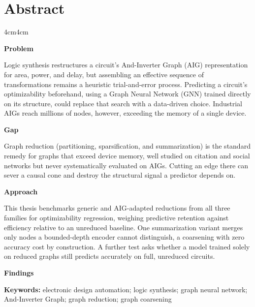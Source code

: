 \chapter*{Abstract}
\label{sec:abstract}
\begin{adjustwidth}{4cm}{4cm}

\par\medskip\noindent\textbf{Problem}\par\nobreak%
Logic synthesis restructures a circuit's And-Inverter Graph (AIG) representation for area, power, and delay, but assembling an effective sequence of transformations remains a heuristic trial-and-error process. Predicting a circuit's optimizability beforehand, using a Graph Neural Network (GNN) trained directly on its structure, could replace that search with a data-driven choice. Industrial AIGs reach millions of nodes, however, exceeding the memory of a single device.

\par\medskip\noindent\textbf{Gap}\par\nobreak%
Graph reduction (partitioning, sparsification, and summarization) is the standard remedy for graphs that exceed device memory, well studied on citation and social networks but never systematically evaluated on AIGs. Cutting an edge there can sever a causal cone and destroy the structural signal a predictor depends on.

\par\medskip\noindent\textbf{Approach}\par\nobreak%
This thesis benchmarks generic and AIG-adapted reductions from all three families for optimizability regression, weighing predictive retention against efficiency relative to an unreduced baseline. One summarization variant merges only nodes a bounded-depth encoder cannot distinguish, a coarsening with zero accuracy cost by construction. A further test asks whether a model trained solely on reduced graphs still predicts accurately on full, unreduced circuits.

\par\medskip\noindent\textbf{Findings}\par\nobreak%

\end{adjustwidth}

\vspace{1em}
\noindent\textbf{Keywords:}
electronic design automation; logic synthesis; graph neural network; And-Inverter Graph; graph reduction; graph coarsening
